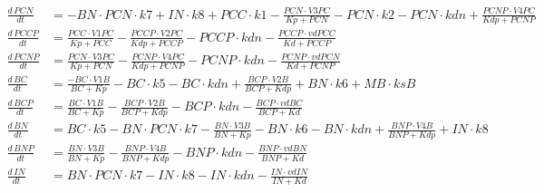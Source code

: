 \begin{table}[p]
\begin{align*}
    \frac{d\,\mathit{PCN}}{dt} &= - \mathit{BN} \cdot \mathit{PCN} \cdot \mathit{k7} + \mathit{IN} \cdot \mathit{k8} + \mathit{PCC} \cdot \mathit{k1} - \frac{\mathit{PCN} \cdot \mathit{V3PC}}{\mathit{Kp} + \mathit{PCN}} - \mathit{PCN} \cdot \mathit{k2} - \mathit{PCN} \cdot \mathit{kdn} + \frac{\mathit{PCNP} \cdot \mathit{V4PC}}{\mathit{Kdp} + \mathit{PCNP}}\\
    \frac{d\,\mathit{PCCP}}{dt} &= \frac{\mathit{PCC} \cdot \mathit{V1PC}}{\mathit{Kp} + \mathit{PCC}} - \frac{\mathit{PCCP} \cdot \mathit{V2PC}}{\mathit{Kdp} + \mathit{PCCP}} - \mathit{PCCP} \cdot \mathit{kdn} - \frac{\mathit{PCCP} \cdot \mathit{vdPCC}}{\mathit{Kd} + \mathit{PCCP}}\\
    \frac{d\,\mathit{PCNP}}{dt} &= \frac{\mathit{PCN} \cdot \mathit{V3PC}}{\mathit{Kp} + \mathit{PCN}} - \frac{\mathit{PCNP} \cdot \mathit{V4PC}}{\mathit{Kdp} + \mathit{PCNP}} - \mathit{PCNP} \cdot \mathit{kdn} - \frac{\mathit{PCNP} \cdot \mathit{vdPCN}}{\mathit{Kd} + \mathit{PCNP}}\\
    \frac{d\,\mathit{BC}}{dt} &= \frac{- \mathit{BC} \cdot \mathit{V1B}}{\mathit{BC} + \mathit{Kp}} - \mathit{BC} \cdot \mathit{k5} - \mathit{BC} \cdot \mathit{kdn} + \frac{\mathit{BCP} \cdot \mathit{V2B}}{\mathit{BCP} + \mathit{Kdp}} + \mathit{BN} \cdot \mathit{k6} + \mathit{MB} \cdot \mathit{ksB}\\
    \frac{d\,\mathit{BCP}}{dt} &= \frac{\mathit{BC} \cdot \mathit{V1B}}{\mathit{BC} + \mathit{Kp}} - \frac{\mathit{BCP} \cdot \mathit{V2B}}{\mathit{BCP} + \mathit{Kdp}} - \mathit{BCP} \cdot \mathit{kdn} - \frac{\mathit{BCP} \cdot \mathit{vdBC}}{\mathit{BCP} + \mathit{Kd}}\\
    \frac{d\,\mathit{BN}}{dt} &= \mathit{BC} \cdot \mathit{k5} - \mathit{BN} \cdot \mathit{PCN} \cdot \mathit{k7} - \frac{\mathit{BN} \cdot \mathit{V3B}}{\mathit{BN} + \mathit{Kp}} - \mathit{BN} \cdot \mathit{k6} - \mathit{BN} \cdot \mathit{kdn} + \frac{\mathit{BNP} \cdot \mathit{V4B}}{\mathit{BNP} + \mathit{Kdp}} + \mathit{IN} \cdot \mathit{k8}\\
    \frac{d\,\mathit{BNP}}{dt} &= \frac{\mathit{BN} \cdot \mathit{V3B}}{\mathit{BN} + \mathit{Kp}} - \frac{\mathit{BNP} \cdot \mathit{V4B}}{\mathit{BNP} + \mathit{Kdp}} - \mathit{BNP} \cdot \mathit{kdn} - \frac{\mathit{BNP} \cdot \mathit{vdBN}}{\mathit{BNP} + \mathit{Kd}}\\
    \frac{d\,\mathit{IN}}{dt} &= \mathit{BN} \cdot \mathit{PCN} \cdot \mathit{k7} - \mathit{IN} \cdot \mathit{k8} - \mathit{IN} \cdot \mathit{kdn} - \frac{\mathit{IN} \cdot \mathit{vdIN}}{\mathit{IN} + \mathit{Kd}}\\
  \end{align*}
\end{table}

